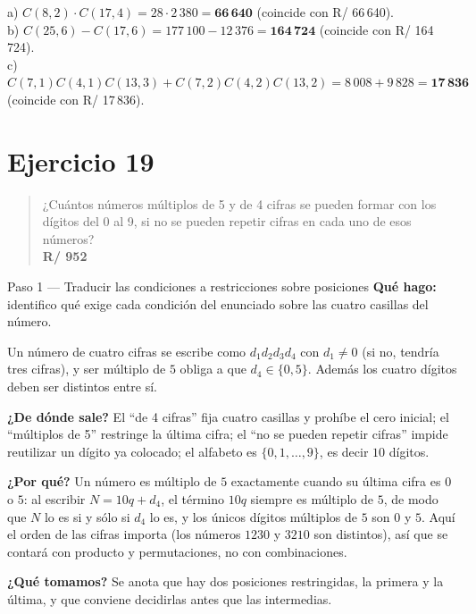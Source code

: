 \documentclass[11pt]{article}
\begin{document}
\begin{resp}
a) $C(8,2)\cdot C(17,4)=28\cdot 2\,380=\mathbf{66\,640}$ (coincide con R/ 66\,640).\\
b) $C(25,6)-C(17,6)=177\,100-12\,376=\mathbf{164\,724}$ (coincide con R/ 164\,724).\\
c) $C(7,1)C(4,1)C(13,3)+C(7,2)C(4,2)C(13,2)=8\,008+9\,828=\mathbf{17\,836}$ (coincide con R/ 17\,836).
\end{resp}

\section*{Ejercicio 19}

\begin{quote}
¿Cuántos números múltiplos de 5 y de 4 cifras se pueden formar con los dígitos del 0 al 9, si no se pueden repetir cifras en cada uno de esos números?\\[2pt]
\textbf{R/ 952}
\end{quote}

\begin{paso}{Paso 1 --- Traducir las condiciones a restricciones sobre posiciones}
\textbf{Qué hago:} identifico qué exige cada condición del enunciado sobre las cuatro casillas del número.

Un número de cuatro cifras se escribe como $d_1d_2d_3d_4$ con $d_1\neq 0$ (si no, tendría tres cifras), y ser múltiplo de $5$ obliga a que $d_4\in\{0,5\}$. Además los cuatro dígitos deben ser distintos entre sí.

\textbf{¿De dónde sale?} El ``de 4 cifras'' fija cuatro casillas y prohíbe el cero inicial; el ``múltiplos de 5'' restringe la última cifra; el ``no se pueden repetir cifras'' impide reutilizar un dígito ya colocado; el alfabeto es $\{0,1,\dots,9\}$, es decir $10$ dígitos.

\textbf{¿Por qué?} Un número es múltiplo de $5$ exactamente cuando su última cifra es $0$ o $5$: al escribir $N=10q+d_4$, el término $10q$ siempre es múltiplo de $5$, de modo que $N$ lo es si y sólo si $d_4$ lo es, y los únicos dígitos múltiplos de $5$ son $0$ y $5$. Aquí el orden de las cifras importa (los números $1230$ y $3210$ son distintos), así que se contará con producto y permutaciones, no con combinaciones.

\textbf{¿Qué tomamos?} Se anota que hay dos posiciones restringidas, la primera y la última, y que conviene decidirlas antes que las intermedias.
\end{paso}
\end{document}
